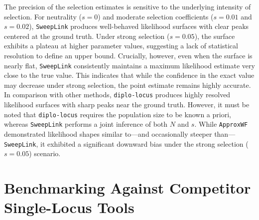\documentclass{article}
\newcommand{\SweepLink}{\texttt{SweepLink}\xspace}
\newcommand{\ApproxWF}{\texttt{ApproxWF}\xspace}
\newcommand{\diplolocus}{\texttt{diplo-locus}\xspace}
\begin{document}
The precision of the selection estimates is sensitive to the underlying intensity of selection.
For neutrality ($s=0$) and moderate selection coefficients ($s=0.01$ and $s=0.02$), \SweepLink produces well-behaved likelihood surfaces with clear peaks centered at the ground truth.
Under strong selection ($s=0.05$), the surface exhibits a plateau at higher parameter values, suggesting a lack of statistical resolution to define an upper bound.
Crucially, however, even when the surface is nearly flat, \SweepLink consistently maintains a maximum likelihood estimate very close to the true value.
This indicates that while the confidence in the exact value may decrease under strong selection, the point estimate remains highly accurate.
In comparison with other methods, \diplolocus produces highly resolved likelihood surfaces with sharp peaks near the ground truth.
However, it must be noted that \diplolocus requires the population size to be known a priori, whereas \SweepLink performs a joint inference of both $N$ and $s$.
While \ApproxWF demonstrated likelihood shapes similar to---and occasionally steeper than---\SweepLink, it exhibited a significant downward bias under the strong selection ($s=0.05$) scenario.

\section{Benchmarking Against Competitor Single-Locus Tools}
\end{document}

